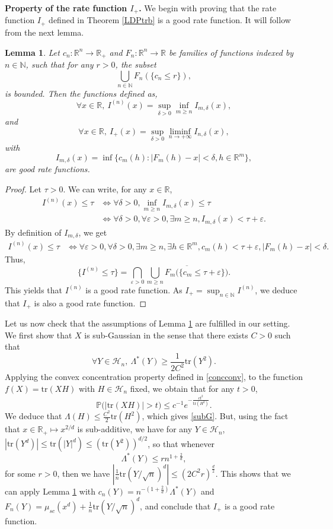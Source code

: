 \documentclass[aop,preprint]{imsart}
\newcommand\NN{\mathbb{N}}
\newcommand\RR{\mathbb{R}}
\newcommand\PP{\mathbb{P}}
\newcommand\tr{\mathrm{tr}}
\newcommand\eps{\varepsilon}
\numberwithin{equation}{section}
\theoremstyle{definition}
\theoremstyle{plain}
\newtheorem{Lem}[Def]{Lemma}
\theoremstyle{remark}
\begin{document}
\textbf{Property of the rate function $I_+$.}
We begin with proving that the rate function $I_+$ defined in Theorem \ref{LDPtrb} is a good rate function. It will follow from the next lemma.

\begin{Lem}\label{lsci}
Let $c_n : \RR^n \to \RR_+$ and  $F_n : \RR^n \to \RR$ be families of functions indexed by $n\in\NN$, such that for any $r>0$, the subset
$$ \bigcup_{n\in \NN}F_n(\{ c_n \leq r \}),$$
is bounded. Then the functions defined as,
$$ \forall x \in \RR, \ I^{(n)}(x) = \sup_{\delta>0} \inf_{m\geq n} I_{m,\delta}(x),$$
and 
$$ \forall x \in \RR, \ I_+(x) = \sup_{\delta>0} \liminf_{n\to +\infty} I_{n,\delta}(x),$$
with
$$ I_{m,\delta}(x) = \inf \big\{ c_m(h) : | F_m(h) -x|<\delta, h \in\RR^m \big\},$$
are good rate functions.
\end{Lem}
\begin{proof}
Let $\tau>0$. We can write, for any $x \in\RR$,
\begin{align*}
I^{(n)}(x) \leq \tau & \Longleftrightarrow \forall \delta >0, \inf_{m\geq n } I_{m,\delta}(x) \leq \tau\\
& \Longleftrightarrow  \forall \delta >0, \forall \eps>0, \exists m\geq n,  I_{m,\delta}(x) <\tau +\eps.
\end{align*}
By definition of $I_{m,\delta}$, we get\begin{align*}
I^{(n)}(x) \leq \tau & \Longleftrightarrow   \forall \eps>0, \forall \delta >0,   \exists m\geq n,  \exists h\in \RR^m, c_m(h) <\tau +\eps, |F_m(h) - x|<\delta.
\end{align*}
Thus,
$$ \{ I^{(n)} \leq \tau \} = \bigcap_{\eps>0} \overline{ \bigcup_{m\geq n } F_m\big(\{ c_m \leq \tau+\eps\}\big )}.$$ 
This yields that $I^{(n)}$ is a good rate function. As $I_+ = \sup_{n\in\NN} I^{(n)}$, we deduce that $I_+$ is also a good rate function.
\end{proof}
Let us now check that the assumptions of Lemma \ref{lsci} are fulfilled in our setting. We first  show that $X$ is sub-Gaussian in the sense that there exists $C>0$ such that 
 \begin{equation} \label{subG} \forall Y \in \mathcal{H}_n, \ \Lambda^*(Y) \geq \frac{1}{2C^2} \tr (Y^2).\end{equation}
Applying the convex concentration property defined in \ref{concconv},  to the function $f(X) =\tr (XH)$ with $H \in\mathcal{H}_n$ fixed, we obtain that for any $t>0$,
$$ \PP\big( | \tr (XH)|>t \big) \leq c^{-1}e^{- \frac{c t^2}{\tr (H^2)}}.$$
We deduce that $\Lambda(H) \leq \frac{C^2}{2} \tr (H^2)$, which gives \eqref{subG}.
But, using the fact that $x\in \RR_+ \mapsto x^{2/d}$ is sub-additive, we have for any $Y\in\mathcal{H}_n$, $|\tr( Y^d)| \leq \tr( |Y|^d)\leq ( \tr (Y^2))^{d/2}$, so that whenever 
$$\Lambda^*(Y) \leq r n^{1+\frac{2}{d}},$$
for some $r>0$, then we have $| \frac{1}{n} \tr(Y/\sqrt{n})^d | \leq (2C^2r)^{\frac{d}{2}}$. This shows that we can apply Lemma \ref{lsci} with $c_n(Y) = n^{-(1+\frac{2}{d})}\Lambda^*(Y)$ and $F_n(Y) = \mu_{sc}(x^d) + \frac{1}{n}\tr(Y/\sqrt{n})^d$, and conclude that $I_+$ is a good rate function.
 
\end{document}
